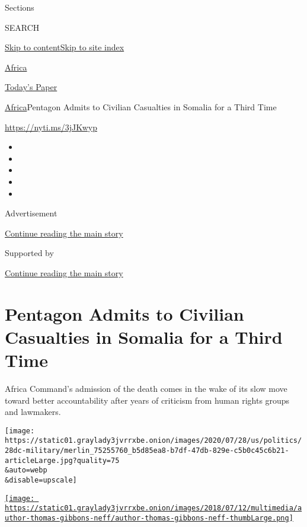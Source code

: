 Sections

SEARCH

\protect\hyperlink{site-content}{Skip to
content}\protect\hyperlink{site-index}{Skip to site index}

\href{https://www.nytimes3xbfgragh.onion/section/world/africa}{Africa}

\href{https://myaccount.nytimes3xbfgragh.onion/auth/login?response_type=cookie\&client_id=vi}{}

\href{https://www.nytimes3xbfgragh.onion/section/todayspaper}{Today's
Paper}

\href{/section/world/africa}{Africa}\textbar{}Pentagon Admits to
Civilian Casualties in Somalia for a Third Time

\url{https://nyti.ms/3jJKwyp}

\begin{itemize}
\item
\item
\item
\item
\item
\end{itemize}

Advertisement

\protect\hyperlink{after-top}{Continue reading the main story}

Supported by

\protect\hyperlink{after-sponsor}{Continue reading the main story}

\hypertarget{pentagon-admits-to-civilian-casualties-in-somalia-for-a-third-time}{%
\section{Pentagon Admits to Civilian Casualties in Somalia for a Third
Time}\label{pentagon-admits-to-civilian-casualties-in-somalia-for-a-third-time}}

Africa Command's admission of the death comes in the wake of its slow
move toward better accountability after years of criticism from human
rights groups and lawmakers.

\texttt{[image: https://static01.graylady3jvrrxbe.onion/images/2020/07/28/us/politics/28dc-military/merlin\_75255760\_b5d85ea8-b7df-47db-829e-c5b0c45c6b21-articleLarge.jpg?quality=75\\\&auto=webp\\\&disable=upscale]}

\href{https://www.nytimes3xbfgragh.onion/by/thomas-gibbons-neff}{\texttt{[image: https://static01.graylady3jvrrxbe.onion/images/2018/07/12/multimedia/author-thomas-gibbons-neff/author-thomas-gibbons-neff-thumbLarge.png]}}

